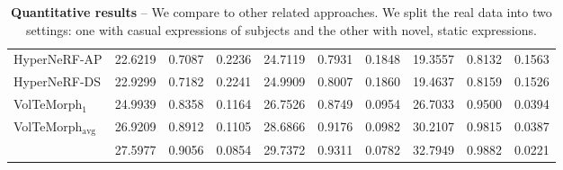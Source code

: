 \begin{table}[!t]
{\begin{tabular}{lccccccccc}
      HyperNeRF-AP \cite{park2021hypernerf}              & 22.6219                                & 0.7087                                   & 0.2236                                   & 24.7119                            & 0.7931                            & 0.1848                            & 19.3557                            & 0.8132                            & 0.1563                            \\
      HyperNeRF-DS \cite{park2021hypernerf}              & 22.9299                                & 0.7182                                   & 0.2241                                   & 24.9909                            & 0.8007                            & 0.1860                            & 19.4637                            & 0.8159                            & 0.1526                            \\
      \midrule
      VolTeMorph$_1$ \cite{garbin2024voltemorph}         & 24.9939                                & 0.8358                                   & 0.1164                                   & 26.7526                            & 0.8749                            & \cellcolor{secondbestcolor}0.0954 & 26.7033                            & 0.9500                            & 0.0394                            \\
      VolTeMorph$_\text{avg}$\cite{garbin2024voltemorph} & \cellcolor{secondbestcolor}26.9209     & \cellcolor{secondbestcolor}0.8912        & \cellcolor{secondbestcolor}0.1105        & \cellcolor{secondbestcolor}28.6866 & \cellcolor{secondbestcolor}0.9176 & 0.0982                            & \cellcolor{secondbestcolor}30.2107 & \cellcolor{secondbestcolor}0.9815 & \cellcolor{secondbestcolor}0.0387 \\
      \midrule
      \textbf{\methodname{}}                             & \cellcolor{firstbestcolor}27.5977      & \cellcolor{firstbestcolor}0.9056         & \cellcolor{firstbestcolor}0.0854         & \cellcolor{firstbestcolor}29.7372  & \cellcolor{firstbestcolor}0.9311  & \cellcolor{firstbestcolor}0.0782  & \cellcolor{firstbestcolor}32.7949  & \cellcolor{firstbestcolor}0.9882  & \cellcolor{firstbestcolor}0.0221  \\
      \bottomrule
    \end{tabular}
  }
  \caption[Quantitative results between \blendfields and chosen baselines]{\textbf{Quantitative results} --
    We compare \blendfields to other related approaches.
    We split the real data into two settings: one with casual expressions of
    subjects and the other with novel, static expressions.
}
\end{table}
